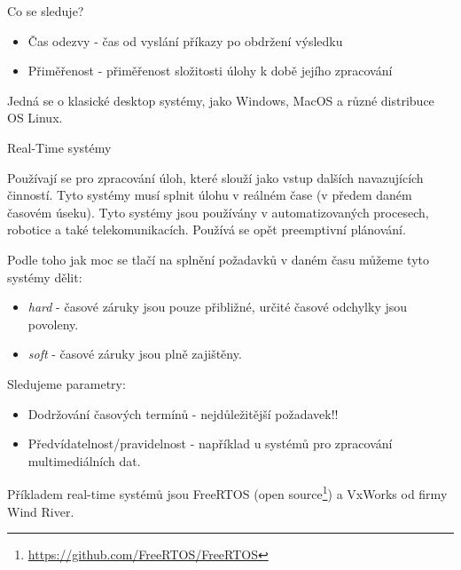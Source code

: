 \vspace{0,5cm}
Co se sleduje?
\begin{itemize}
    \item Čas odezvy - čas od vyslání příkazy po obdržení výsledku
    \item Přiměřenost - přiměřenost složitosti úlohy k době jejího zpracování
\end{itemize}

\vspace{0,5cm}

Jedná se o klasické desktop systémy, jako Windows, MacOS a různé distribuce OS Linux. 

\begin{large}
    \vspace{0,5cm}
    Real-Time systémy
\end{large}

Používají se pro zpracování úloh, které slouží jako vstup dalších navazujících činností. Tyto systémy musí splnit úlohu v reálném čase (v předem daném časovém úseku). Tyto systémy jsou používány v automatizovaných procesech, robotice a také telekomunikacích. Používá se opět preemptivní plánování. 

\vspace{0,5cm}

Podle toho jak moc se tlačí na splnění požadavků v daném času můžeme tyto systémy dělit:

\begin{itemize}
    \item \textit{hard} - časové záruky jsou pouze přibližné, určité časové odchylky jsou povoleny.
    \item \textit{soft} - časové záruky jsou plně zajištěny. 
\end{itemize}

\vspace{0,5cm}

Sledujeme parametry:

\begin{itemize}
    \item Dodržování časových termínů - nejdůležitější požadavek!!
    \item Předvídatelnost/pravidelnost - například u systémů pro zpracování multimediálních dat.
\end{itemize}

\vspace{0,5cm}
Příkladem real-time systémů jsou FreeRTOS (open source\footnote{\url{https://github.com/FreeRTOS/FreeRTOS}}) a VxWorks od firmy Wind River. 

